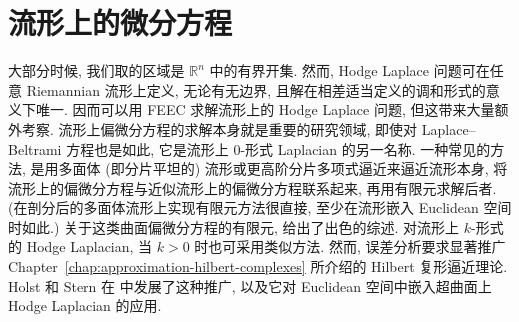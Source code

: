 \section{流形上的微分方程}\label{sec:manifold-equations}

大部分时候, 我们取的区域是 $\mathbb R^n$ 中的有界开集. 然而, Hodge Laplace 问题可在任意 Riemannian 流形上定义, 无论有无边界, 且解在相差适当定义的调和形式的意义下唯一. 因而可以用 FEEC 求解流形上的 Hodge Laplace 问题, 但这带来大量额外考察. 流形上偏微分方程的求解本身就是重要的研究领域, 即使对 Laplace–Beltrami 方程也是如此, 它是流形上 0-形式 Laplacian 的另一名称. 一种常见的方法, 是用多面体 (即分片平坦的) 流形或更高阶分片多项式逼近来逼近流形本身, 将流形上的偏微分方程与近似流形上的偏微分方程联系起来, 再用有限元求解后者. (在剖分后的多面体流形上实现有限元方法很直接, 至少在流形嵌入 Euclidean 空间时如此.) 关于这类曲面偏微分方程的有限元,  给出了出色的综述. 对流形上 $k$-形式的 Hodge Laplacian, 当 $k>0$ 时也可采用类似方法. 然而, 误差分析要求显著推广 Chapter~\ref{chap:approximation-hilbert-complexes} 所介绍的 Hilbert 复形逼近理论. Holst 和 Stern 在  中发展了这种推广, 以及它对 Euclidean 空间中嵌入超曲面上 Hodge Laplacian 的应用.
